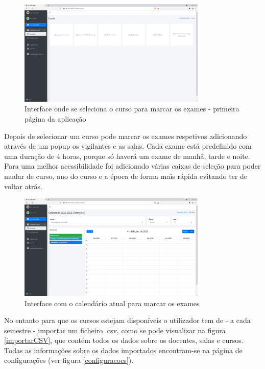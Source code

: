 \documentclass[11pt, twoside]{report}
\begin{document}
	\begin{figure}[H] 
		\centering 							\includegraphics[width=0.8\textwidth,height=0.8\textheight,keepaspectratio]{image/PrototipoAFNF/VisualizarCalendario}
		\caption{Interface onde se seleciona o curso para marcar os exames - primeira página da aplicação}
		\label{selecionarCurso}
	\end{figure}

	Depois de selecionar um curso pode marcar os exames respetivos adicionando através de um popup os vigilantes e as salas. Cada exame está predefinido com uma duração de 4 horas, porque só haverá um exame de manhã, tarde e noite. Para uma melhor acessibilidade foi adicionado várias caixas de seleção para poder mudar de curso, ano do curso e a época de forma mais rápida evitando ter de voltar atrás. 

	\begin{figure}[H] 
		\centering 							\includegraphics[width=0.8\textwidth,height=0.8\textheight,keepaspectratio]{image/PrototipoAFNF/VerCalendarioAtual}
		\caption{Interface com o calendário atual para marcar os exames}
		\label{marcarExames}
	\end{figure}
	
	No entanto para que os cursos estejam disponíveis o utilizador tem de - a cada semestre - importar um ficheiro .csv, como se pode visualizar na figura \ref{importarCSV}, que contém todos os dados sobre os docentes, salas e cursos. Todas as informações sobre os dados importados encontram-se na página de configurações (ver figura \ref{configuracoes}). 
	
\end{document}
